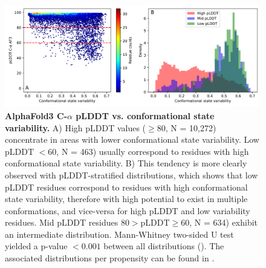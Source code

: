 \begin{figure}[H]
    \centering
    \includegraphics[width=\textwidth]{pLDDT/plddt_figures/af3_plddt_vs_conformational_state_variability_hexbin_complete_hist.pdf}
    \caption{
    \textbf{AlphaFold3 C-$\alpha$ pLDDT vs. conformational state variability.} 
    A) High pLDDT values (\( \geq 80 \), N = 10,272) concentrate in areas with lower conformational state variability. Low pLDDT \( < 60 \), N = 463) usually correspond to residues with high conformational state variability. B) This tendency is more clearly observed with pLDDT-stratified distributions, which shows that low pLDDT residues correspond to residues with high conformational state variability, therefore with high potential to exist in multiple conformations, and vice-versa for high pLDDT and low variability residues. Mid pLDDT residues \( 80 > \text{pLDDT} \geq 60 \),  N = 634) exhibit an intermediate distribution. Mann-Whitney two-sided U test yielded a p-value \( < 0.001 \) between all distributions (). The associated distributions per propensity can be found in .
    }
    \label{fig:af3_plddt_vs_conf_state_undivided}
\end{figure}


